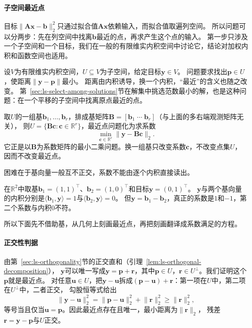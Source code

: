 \paragraph{子空间最近点}

目标$\lVert\bm A\bm x-\bm b\rVert_2^2$只通过拟合值$\bm A\bm x$依赖输入，而拟合值取遍列空间。
所以问题可以分两步：先在列空间中找离$\bm b$最近的点，再求产生这个点的输入。
第一步只涉及一个子空间和一个目标，我们在一般的有限维实内积空间中讨论它，结论对加权内积和函数空间也适用。

设$V$为有限维实内积空间，$U\subseteq V$为子空间，给定目标$\bm y\in V$。
问题要求找出$\bm p\in U$，使距离$\lVert\bm y-\bm p\rVert$最小。
距离由内积诱导，换一个内积，“最近”的含义也随之改变。
第~\ref{sec:ls-select-among-solutions}节在解集中挑选范数最小的解，也是这种问题：在一个平移的子空间中找离原点最近的点。

取$U$的一组基$\bm b_1,\ldots,\bm b_r$，排成基矩阵$\bm B=[\bm b_1\;\cdots\;\bm b_r]$（与上面的多右端观测矩阵无关），
则$U=\{\bm B\bm c:\bm c\in\mathbb R^r\}$，最近点问题化为求系数
\begin{equation}
 \min_{\bm c\in\mathbb R^r}\lVert\bm y-\bm B\bm c\rVert_2.
 \label{eq:ls-nearest-point-coefficients}
\end{equation}
它正是以$\bm B$为系数矩阵的最小二乘问题。换一组基只改变系数$\bm c$，不改变点集$U$，因而不改变最近点。

困难在于基向量一般互不正交，系数不能由逐个内积直接读出。

\begin{example}[反例：非正交基下系数不等于内积]
\label{ex:ls-nonorthogonal-coefficients}
在$\mathbb R^2$中取基$\bm b_1=(1,1)^\top$、$\bm b_2=(1,0)^\top$和目标$\bm y=(0,1)^\top$。
$\bm y$与两个基向量的内积分别是$\langle\bm b_1,\bm y\rangle=1$与$\langle\bm b_2,\bm y\rangle=0$。
但$\bm y=\bm b_1-\bm b_2$，真正的系数是$1$和$-1$，第二个系数与内积$0$不符。
\end{example}

所以下面先不借助基，从几何上刻画最近点，再把刻画翻译成系数满足的方程。

\paragraph{正交性判据}

由第~\ref{sec:ls-orthogonality}节的正交直和（引理~\ref{lem:ls-orthogonal-decomposition}），
$\bm y$可以唯一写成$\bm y=\bm p+\bm r$，其中$\bm p\in U$，$\bm r\in U^\perp$。我们证明这个$\bm p$就是最近点。
对任意$\bm u\in U$，把$\bm y-\bm u$拆成$(\bm p-\bm u)+\bm r$：第一项在$U$中，第二项在$U^\perp$中，二者正交，
勾股恒等式给出
\begin{equation}
 \lVert\bm y-\bm u\rVert_2^2
 =\lVert\bm p-\bm u\rVert_2^2+\lVert\bm r\rVert_2^2
 \geq\lVert\bm r\rVert_2^2,
 \label{eq:ls-nearest-point-pythagoras}
\end{equation}
等号当且仅当$\bm u=\bm p$。因此最近点存在且唯一，最小距离为$\lVert\bm r\rVert_2$，
残差$\bm r=\bm y-\bm p$与$U$正交。

